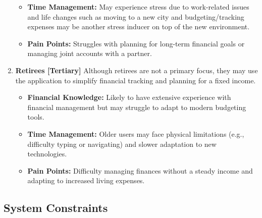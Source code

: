 \documentclass[12pt]{article}
\begin{document}
\begin{enumerate}
\begin{itemize}
			\item \textbf{Time Management:} May experience stress due to work-related issues and life changes such as moving to a new city and budgeting/tracking expenses may be another stress inducer on top of the new environment.
			\item \textbf{Pain Points:} Struggles with planning for long-term financial goals or managing joint accounts with a partner.
		\end{itemize}
	\item \textbf{Retirees [Tertiary]}
		Although retirees are not a primary focus, they may use the application to simplify financial tracking and planning for a fixed income.
		\begin{itemize}
			\item \textbf{Financial Knowledge:} Likely to have extensive experience with financial management but may struggle to adapt to modern budgeting tools.
			\item \textbf{Time Management:} Older users may face physical limitations (e.g., difficulty typing or navigating) and slower adaptation to new technologies.
			\item \textbf{Pain Points:} Difficulty managing finances without a steady income and adapting to increased living expenses.
		\end{itemize}
\end{enumerate}

\newpage

\subsection{System Constraints}
\end{document}
